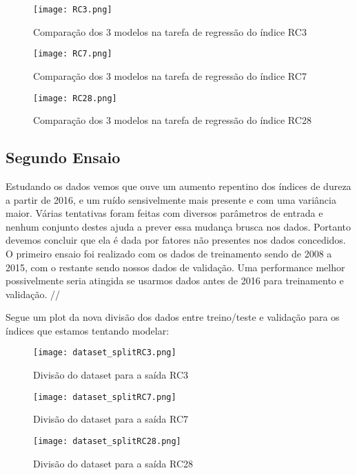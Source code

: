 \begin{figure}[H]
\centering
\texttt{[image: RC3.png]}
\caption{Comparação dos 3 modelos na tarefa de regressão do índice RC3}
\end{figure}

\begin{figure}[H]
\centering
\texttt{[image: RC7.png]}
\caption{Comparação dos 3 modelos na tarefa de regressão do índice RC7}
\end{figure}

\begin{figure}[H]
\centering
\texttt{[image: RC28.png]}
\caption{Comparação dos 3 modelos na tarefa de regressão do índice RC28}
\end{figure}


\subsection{Segundo Ensaio}

Estudando os dados vemos que ouve um aumento repentino dos índices de dureza a partir de 2016, e um ruído sensivelmente mais presente e com uma variância maior. Várias tentativas foram feitas com diversos parâmetros de entrada e nenhum conjunto destes ajuda a prever essa mudança brusca nos dados. Portanto devemos concluir que ela é dada por fatores não presentes nos dados concedidos. O primeiro ensaio foi realizado com os dados de treinamento sendo de 2008 a 2015, com o restante sendo nossos dados de validação. Uma performance melhor possivelmente seria atingida se usarmos dados antes de 2016 para treinamento e validação. //


Segue um plot da nova divisão dos dados entre treino/teste e validação para os índices que estamos tentando modelar:

\begin{figure}[H]
\centering
\texttt{[image: dataset\_splitRC3.png]}
\caption{Divisão do dataset para a saída RC3}
\end{figure}

\begin{figure}[H]
\centering
\texttt{[image: dataset\_splitRC7.png]}
\caption{Divisão do dataset para a saída RC7}
\end{figure}

\begin{figure}[H]
\centering
\texttt{[image: dataset\_splitRC28.png]}
\caption{Divisão do dataset para a saída RC28}
\end{figure}


